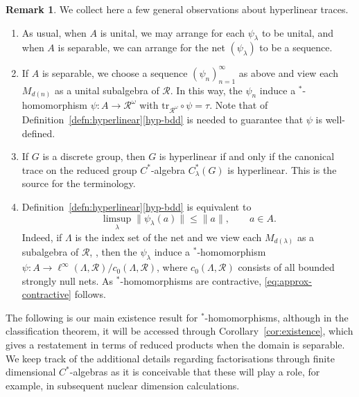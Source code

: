 \documentclass[a4paper,11pt]{amsart}
\theoremstyle{definition}
\newtheorem{remark}[theorem]{Remark}
\numberwithin{equation}{section}
\numberwithin{theorem}{section}
\newcommand{\tr}{\mathrm{tr}}
\begin{document}
\begin{remark}
	We collect here a few general observations about hyperlinear traces.
\begin{enumerate}
	\item As usual, when $A$ is unital, we may arrange for each $\psi_\lambda$ to be unital, and when $A$ is separable, we can arrange for the net $(\psi_\lambda)$ to be a sequence.
	\item If $A$ is separable, we choose a sequence $(\psi_n)_{n=1}^\infty$ as above and view each $M_{d(n)}$ as a unital subalgebra of $\mathcal R$.  In this way, the $\psi_n$ induce a $^*$-homomorphism $\psi \colon A \rightarrow \mathcal R^\omega$ with $\tr_{\mathcal R^\omega} \circ \psi = \tau$.  Note that of Definition~\ref{defn:hyperlinear}\ref{hyp-bdd} is needed to guarantee that $\psi$ is well-defined.
	\item If $G$ is a discrete group, then $G$ is hyperlinear if and only if the canonical trace on the reduced group $C^*$-algebra $C^*_\lambda(G)$ is hyperlinear.  This is the source for the terminology.
	\item  Definition~\ref{defn:hyperlinear}\ref{hyp-bdd} is equivalent to 
	\begin{equation}\label{eq:approx-contractive}
		\limsup_\lambda \|\psi_\lambda(a) \| \leq \|a\|, \qquad a \in A.
	\end{equation}
	Indeed, if $\Lambda$ is the index set of the net and we view each $M_{d(\lambda)}$ as a subalgebra of $\mathcal R$, , then the $\psi_\lambda$ induce a $^*$-homomorphism $\psi \colon A \rightarrow \ell^\infty(\Lambda, \mathcal R) / c_0(\Lambda, \mathcal R)$, where $c_0(\Lambda, \mathcal R)$ consists of all bounded strongly null nets.  As $^*$-homomorphisms are contractive, \eqref{eq:approx-contractive} follows.
\end{enumerate}
\end{remark}

The following is our main existence result for $^*$-homomorphisms, although in the classification theorem, it will be accessed through Corollary~\ref{cor:existence}, which gives a restatement in terms of reduced products when the domain is separable.  We keep track of the additional details regarding factorisations through finite dimensional $C^*$-algebras as it is conceivable that these will play a role, for example, in subsequent nuclear dimension calculations.
\end{document}
